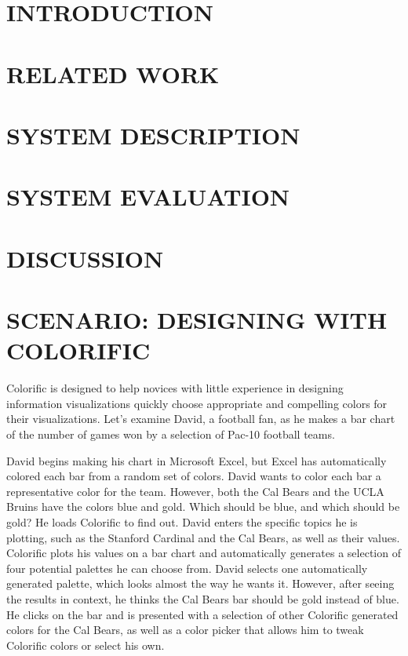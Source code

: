 \documentclass{article}
\begin{document}



\section{INTRODUCTION}


\section{RELATED WORK}

\section{SYSTEM DESCRIPTION}

\section{SYSTEM EVALUATION}

\section{DISCUSSION}

\section{SCENARIO: DESIGNING WITH COLORIFIC}
Colorific is designed to help novices with little experience in designing information visualizations quickly choose appropriate and compelling colors for their visualizations. Let's examine David, a football fan, as he makes a bar chart of the number of games won by a selection of Pac-10 football teams. 

David begins making his chart in Microsoft Excel, but Excel has automatically colored each bar from a random set of colors. David wants to color each bar a representative color for the team. However, both the Cal Bears and the UCLA Bruins have the colors blue and gold. Which should be blue, and which should be gold? He loads Colorific to find out. David enters the specific topics he is plotting, such as the Stanford Cardinal and the Cal Bears, as well as their values. Colorific plots his values on a bar chart and automatically generates a selection of four potential palettes he can choose from. David selects one automatically generated palette, which looks almost the way he wants it. However, after seeing the results in context, he thinks the Cal Bears bar should be gold instead of blue. He clicks on the bar and is presented with a selection of other Colorific generated colors for the Cal Bears, as well as a color picker that allows him to tweak Colorific colors or select his own. 
\end{document}
